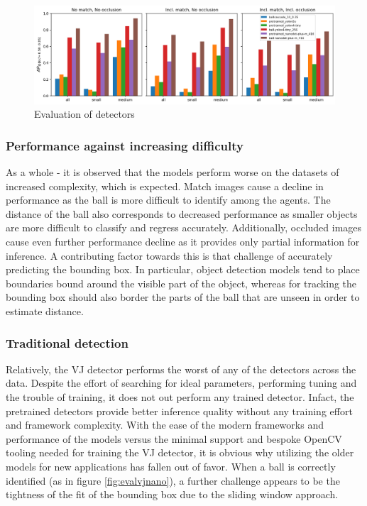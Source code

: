 \documentclass[a4paper,twoside,12pt]{report}
\begin{document}
\begin{figure}[h!]
\begin{center}
\includegraphics[width=15.5cm]{images/eval_detect.png}
\caption{Evaluation of detectors}
\label{fig:evaldetect}
\end{center}
\end{figure}

\subsubsection{Performance against increasing difficulty}

As a whole - it is observed that the models perform worse on the datasets of increased complexity, which is expected. Match images cause a decline in performance as the ball is more difficult to identify among the agents. The distance of the ball also corresponds to decreased performance as smaller objects are more difficult to classify and regress accurately. Additionally, occluded images cause even further performance decline as it provides only partial information for inference. A contributing factor towards this is that challenge of accurately predicting the bounding box. In particular, object detection models tend to place boundaries bound around the visible part of the object, whereas for tracking the bounding box should also border the parts of the ball that are unseen in order to estimate distance. 

\subsubsection{Traditional detection}

Relatively, the VJ detector performs the worst of any of the detectors across the data. Despite the effort of searching for ideal parameters, performing tuning and the trouble of training, it does not out perform any trained detector. Infact, the pretrained detectors provide better inference quality without any training effort and framework complexity. With the ease of the modern frameworks and performance of the models versus the minimal support and bespoke OpenCV tooling needed for training the VJ detector, it is obvious why utilizing the older models for new applications has fallen out of favor. When a ball is correctly identified (as in figure \ref{fig:evalvjnano}), a further challenge appears to be the tightness of the fit of the bounding box due to the sliding window approach.
\end{document}
